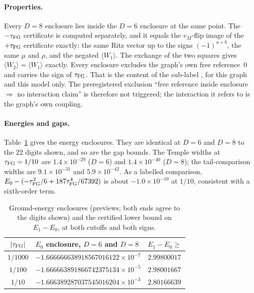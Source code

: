 \paragraph{Properties.}
Every $D=8$ enclosure lies inside the $D=6$ enclosure at the same point. The
$-\tau_{\mathrm{FG}}$ certificate is computed separately, and it equals the $v_M$-flip image
of the $+\tau_{\mathrm{FG}}$ certificate exactly: the same Ritz vector up to the signs
$(-1)^{a+b}$, the same $\mu$ and $\rho$, and the negated $\langle W_1\rangle$.
The exchange of the two squares gives $\langle W_2\rangle=\langle W_1\rangle$
exactly. Every enclosure excludes the graph's own free reference~0 and carries
the sign of $\tau_{\mathrm{FG}}$. That is the content of the sub-label
, for this graph and this model only. The
preregistered exclusion ``free reference inside enclosure $\Rightarrow$ no
interaction claim'' is therefore not triggered; the interaction it refers to
is the graph's own coupling.

\paragraph{Energies and gaps.}
Table~\ref{tab:az2-energies} gives the energy enclosures. They are identical
at $D=6$ and $D=8$ to the 22 digits shown, and so are the gap bounds. The
Temple widths at $\tau_{\mathrm{FG}}=1/10$ are $1.4\times10^{-29}$ ($D=6$) and
$1.4\times10^{-40}$ ($D=8$); the tail-comparison widths are
$9.1\times10^{-31}$ and $5.9\times10^{-42}$. As a labelled comparison,
$E_0-(-\tau_{\mathrm{FG}}^2/6+187\tau_{\mathrm{FG}}^4/67392)$ is about $-1.0\times10^{-10}$ at $1/10$,
consistent with a sixth-order term.

\begin{table}[htbp]
\centering\small
\caption{Ground-energy enclosures (previews; both ends agree to the digits
shown) and the certified lower bound on $E_1-E_0$, at both cutoffs and both
signs.}
\label{tab:az2-energies}
\begin{tabular}{@{}cll@{}}
\toprule
$|\tau_{\mathrm{FG}}|$ & $E_0$ enclosure, $D=6$ and $D=8$ & $E_1-E_0\ge$\\
\midrule
$1/1000$ & $-1.666666638918567016122\times10^{-7}$ & $2.99800017$\\
$1/100$ & $-1.666663891866742375134\times10^{-5}$ & $2.98001667$\\
$1/10$ & $-1.666389287037545016204\times10^{-3}$ & $2.80166639$\\
\bottomrule
\end{tabular}
\end{table}

